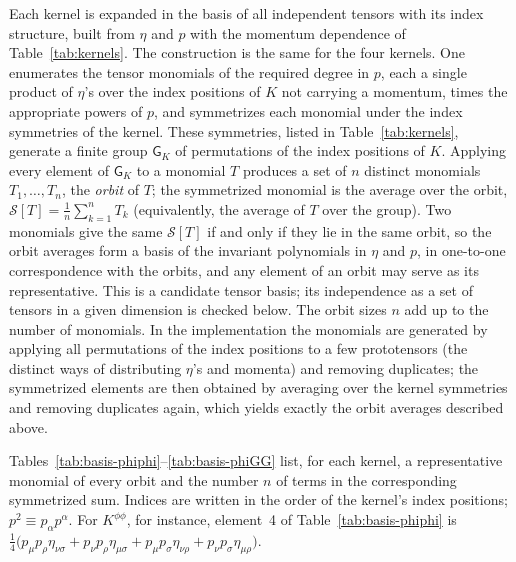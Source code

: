 \documentclass[prd,aps,preprint,nofootinbib,amsmath,amssymb,eqsecnum]{revtex4-2}
\begin{document}
Each kernel is expanded in the basis of all independent tensors with its index structure,
built from $\eta$ and $p$ with the momentum dependence of Table~\ref{tab:kernels}. The
construction is the same for the four kernels. One enumerates the tensor monomials of the
required degree in $p$, each a single product of $\eta$'s over the index
positions of $K$ not carrying a
momentum, times the appropriate powers of $p$, and symmetrizes each monomial under the
index symmetries of the kernel. These symmetries, listed in Table~\ref{tab:kernels}, generate
a finite group $\mathsf{G}_K$ of permutations of the index positions of $K$. Applying every
element of $\mathsf{G}_K$ to a monomial $T$ produces a set of $n$ distinct monomials
$T_1,\dots,T_n$, the \emph{orbit} of $T$; the symmetrized monomial is the average over the
orbit, $\mathcal{S}[T]=\frac1n\sum_{k=1}^{n}T_k$ (equivalently, the average of $T$ over the
group). Two monomials give the same $\mathcal{S}[T]$ if and only if they lie in the same
orbit, so the orbit averages form a basis of the invariant polynomials in $\eta$ and $p$, in
one-to-one correspondence with the orbits, and any element of an orbit may serve as its
representative. This is a candidate tensor basis; its independence as a set of tensors in a
given dimension is checked below. The orbit sizes $n$ add up to the number of monomials. In
the implementation the monomials are generated by applying all permutations of the index
positions to a few prototensors (the distinct ways of distributing $\eta$'s and momenta) and
removing duplicates; the symmetrized elements are then obtained by averaging over the
kernel symmetries and removing duplicates again, which yields exactly the orbit averages
described above.

Tables~\ref{tab:basis-phiphi}--\ref{tab:basis-phiGG} list, for each kernel, a representative
monomial of every orbit and the number $n$ of terms in the corresponding symmetrized sum.
Indices are written in the order of the kernel's index positions; $p^2\equiv p_\alpha p^\alpha$. For
$K^{\phi\phi}$, for instance, element~4 of Table~\ref{tab:basis-phiphi} is
$\tfrac14\big(p_\mu p_\rho\eta_{\nu\sigma}+p_\nu p_\rho\eta_{\mu\sigma}
+p_\mu p_\sigma\eta_{\nu\rho}+p_\nu p_\sigma\eta_{\mu\rho}\big)$.
\end{document}

